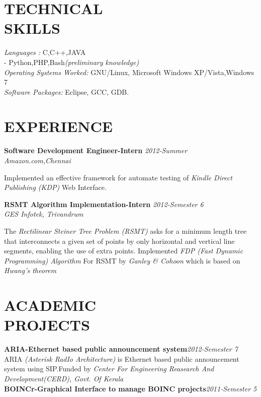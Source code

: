 \documentclass[line,margin]{res}
\begin{document}
\begin{resume}
	  \section{TECHNICAL \\ SKILLS} 
		  {\it Languages :} C,C++,JAVA\\-\hspace{15 mm} Python,PHP,Bash{\it (preliminary knowledge)}\\
		  {\it Operating Systems Worked:} GNU/Linux, Microsoft Windows XP/Vista,Windows 7\\
		  {\it Software Packages:} Eclipse, GCC, GDB.\\
	  \section{EXPERIENCE}
		  {\bf Software Development Engineer-Intern }\hfill {\it 2012-Summer } \\
		  {\it Amazon.com,Chennai }
		  
		  Implemented an effective framework for automate testing of {\it Kindle Direct Publishing (KDP)} Web Interface.
		  
		  {\bf RSMT Algorithm Implementation-Intern }\hfill {\it 2012-Semester 6 } \\
		  {\it GES Infotek, Trivandrum }
		  
		  The {\it Rectilinear Steiner Tree Problem (RSMT)} asks for a minimum length tree that interconnects a given set of points by only horizontal and vertical line segments, enabling the use of extra points. Implemented {\it FDP (Fast Dynamic Programming) Algorithm } For RSMT by {\it Ganley \& Cohoon } which is based on {\it Hwang’s theorem}\\
	  \section{ACADEMIC \\ PROJECTS}
	    	  {\bf ARIA-Ethernet based public announcement system}\hfill {\it 2012-Semester 7}\\
	          
	    	  ARIA {\it (Asterisk RadIo Architecture)} is Ethernet based public announcement system using SIP.Funded by {\it Center For Engineering Reasearch And Development(CERD), Govt. Of Kerala}\\
	                          
                  {\bf BOINCr-Graphical Interface to manage BOINC projects}\hfill {\it 2011-Semester 5}\\
	                          

\end{resume}
\end{document}
